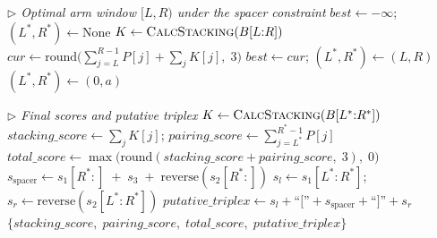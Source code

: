 \documentclass{article}
\begin{document}
\begin{algorithm}
\begin{algorithmic}[1]
\Statex \textit{$\triangleright$ Optimal arm window $[L, R)$ under the spacer constraint}
\State $\mathit{best} \leftarrow -\infty$;\; $(L^*, R^*) \leftarrow \mathrm{None}$
            \State $K \leftarrow \textsc{CalcStacking}(B[L{:}R])$
            \State $\mathit{cur} \leftarrow
                   \mathrm{round}\!\bigl(\textstyle\sum_{j=L}^{R-1} P[j]
                   + \sum_j K[j],\; 3\bigr)$
                \State $\mathit{best} \leftarrow \mathit{cur}$;\;
                       $(L^*, R^*) \leftarrow (L, R)$
            \EndIf
        \EndIf
    \EndFor
\EndFor
{}
    \State $(L^*, R^*) \leftarrow (0, a)$
\EndIf

\Statex \textit{$\triangleright$ Final scores and putative triplex}
\State $K \leftarrow \textsc{CalcStacking}(B[L^*{:}R^*])$
\State $\mathit{stacking\_score} \leftarrow \textstyle\sum_j K[j]$;\;
       $\mathit{pairing\_score} \leftarrow \textstyle\sum_{j=L^*}^{R^*-1} P[j]$
\State $\mathit{total\_score} \leftarrow
       \max\bigl(\mathrm{round}(\mathit{stacking\_score} + \mathit{pairing\_score},\; 3),\; 0\bigr)$
\State $s_{\mathrm{spacer}} \leftarrow
       s_1[R^*{:}] \;+\; s_3 \;+\; \mathrm{reverse}(s_2[R^*{:}])$
\State $s_l \leftarrow s_1[L^*{:}R^*]$;\;
       $s_r \leftarrow \mathrm{reverse}(s_2[L^*{:}R^*])$
\State $\mathit{putative\_triplex} \leftarrow
       s_l + \text{``[''} + s_{\mathrm{spacer}} + \text{``]''} + s_r$
\State \Return $\{\mathit{stacking\_score},\;
                  \mathit{pairing\_score},\;
                  \mathit{total\_score},\;
                  \mathit{putative\_triplex}\}$
\end{algorithmic}
\end{algorithm}
\end{document}
